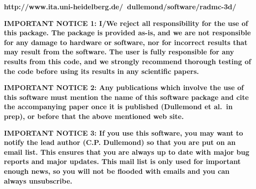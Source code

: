 \documentclass{report}
\begin{document}
{\bf http://www.ita.uni-heidelberg.de/~dullemond/software/radmc-3d/}

{\bf IMPORTANT NOTICE 1: I/We reject all responsibility for the use of this
  package. The package is provided as-is, and we are not responsible for any
  damage to hardware or software, nor for incorrect results that may result
  from the software. The user is fully responsible for any results from this
  code, and we strongly recommend thorough testing of the code before using
  its results in any scientific papers.}

{\bf IMPORTANT NOTICE 2: Any publications which involve the use of this
  software must mention the name of this software package and cite the
  accompanying paper once it is published (Dullemond et al.\ in prep), or
  before that the above mentioned web site.}

{\bf IMPORTANT NOTICE 3: If you use this software, you may want to notify
  the lead author (C.P. Dullemond) so that you are put on an email list. 
  This ensures that you are always up to date with major bug reports and
  major updates. This mail list is only used for important enough news,
  so you will not be flooded with emails and you can always unsubscribe.}


\end{document}
